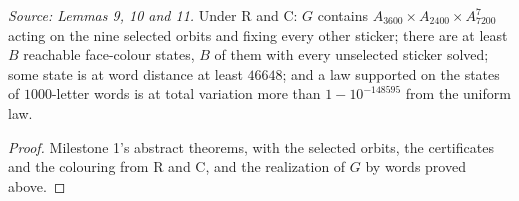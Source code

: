 \begin{theorem}
  \label{thm:selected-lemmas}
  \leanok
  \textit{Source: Lemmas 9, 10 and 11.}
  Under R and C: \(G\) contains
  \(A_{3600}\times A_{2400}\times A_{7200}^7\) acting on the nine selected
  orbits and fixing every other sticker; there are at least \(B\) reachable
  face-colour states, \(B\) of them with every unselected sticker solved;
  some state is at word distance at least \(46648\); and a law supported
  on the states of \(1000\)-letter words is at total variation more than
  \(1-10^{-148595}\) from the uniform law.
\end{theorem}
\begin{proof}
  \leanok
  Milestone 1's abstract theorems, with the selected orbits, the
  certificates and the colouring from R and C, and the realization of
  \(G\) by words proved above.
\end{proof}
